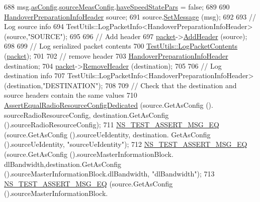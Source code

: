 \begin{DoxyCode}
688   msg.\hyperlink{structns3_1_1LteRrcSap_1_1HandoverPreparationInfo_ada81e3cab2aba473d2cdd8b142c638e6}{asConfig}.\hyperlink{structns3_1_1LteRrcSap_1_1AsConfig_a2ce82c6247fc2469637bd9b31104dcf5}{sourceMeasConfig}.\hyperlink{structns3_1_1LteRrcSap_1_1MeasConfig_aabf400c6da90071d7f1693e357511efc}{haveSpeedStatePars} = \textcolor{keyword}{false};
689 
690   \hyperlink{classns3_1_1HandoverPreparationInfoHeader}{HandoverPreparationInfoHeader} source;
691   source.\hyperlink{classns3_1_1HandoverPreparationInfoHeader_a5d49abf255053e84008541a51b0b8bd2}{SetMessage} (msg);
692 
693   \textcolor{comment}{// Log source info}
694   TestUtils::LogPacketInfo<HandoverPreparationInfoHeader> (source,\textcolor{stringliteral}{"SOURCE"});
695 
696   \textcolor{comment}{// Add header}
697   \hyperlink{classRrcHeaderTestCase_a6f0748c0e845f797497fbda1ca781803}{packet}->\hyperlink{classns3_1_1Packet_a465108c595a0bc592095cbcab1832ed8}{AddHeader} (source);
698 
699   \textcolor{comment}{// Log serialized packet contents}
700   \hyperlink{classTestUtils_a9391dac3282094e6e57c0052d88a086f}{TestUtils::LogPacketContents} (\hyperlink{classRrcHeaderTestCase_a6f0748c0e845f797497fbda1ca781803}{packet});
701 
702   \textcolor{comment}{// remove header}
703   \hyperlink{classns3_1_1HandoverPreparationInfoHeader}{HandoverPreparationInfoHeader} destination;
704   \hyperlink{classRrcHeaderTestCase_a6f0748c0e845f797497fbda1ca781803}{packet}->\hyperlink{classns3_1_1Packet_a0961eccf975d75f902d40956c93ba63e}{RemoveHeader} (destination);
705 
706   \textcolor{comment}{// Log destination info}
707   TestUtils::LogPacketInfo<HandoverPreparationInfoHeader> (destination,\textcolor{stringliteral}{"DESTINATION"});
708 
709   \textcolor{comment}{// Check that the destination and source headers contain the same values}
710   \hyperlink{classRrcHeaderTestCase_ab6230c6987acd58d7482ca5e40b80875}{AssertEqualRadioResourceConfigDedicated} (source.GetAsConfig ().
      sourceRadioResourceConfig, destination.GetAsConfig ().sourceRadioResourceConfig);
711   \hyperlink{group__testing_ga2a9d78cffb3db8e867c35fff0b698cf5}{NS\_TEST\_ASSERT\_MSG\_EQ} (source.GetAsConfig ().sourceUeIdentity, destination.
      GetAsConfig ().sourceUeIdentity, \textcolor{stringliteral}{"sourceUeIdentity"});
712   \hyperlink{group__testing_ga2a9d78cffb3db8e867c35fff0b698cf5}{NS\_TEST\_ASSERT\_MSG\_EQ} (source.GetAsConfig ().sourceMasterInformationBlock.
      dlBandwidth,destination.GetAsConfig ().sourceMasterInformationBlock.dlBandwidth, \textcolor{stringliteral}{"dlBandwidth"});
713   \hyperlink{group__testing_ga2a9d78cffb3db8e867c35fff0b698cf5}{NS\_TEST\_ASSERT\_MSG\_EQ} (source.GetAsConfig ().sourceMasterInformationBlock.

\end{DoxyCode}

